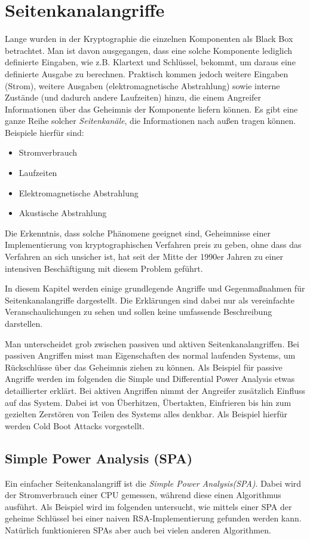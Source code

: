 \chapter{Seitenkanalangriffe}
\label{sec:seitenkanalangriffe}
Lange wurden in der Kryptographie die einzelnen Komponenten als Black
Box betrachtet. Man ist davon ausgegangen, dass eine solche Komponente
lediglich definierte Eingaben, wie z.B. Klartext und Schlüssel, bekommt,
um daraus eine definierte Ausgabe zu berechnen. Praktisch kommen jedoch
weitere Eingaben (Strom), weitere Ausgaben (elektromagnetische
Abstrahlung) sowie interne Zustände (und dadurch andere Laufzeiten)
hinzu, die einem Angreifer Informationen über das Geheimnis der
Komponente liefern können. Es gibt eine ganze Reihe solcher
\emph{Seitenkanäle}, die Informationen nach außen tragen
können. Beispiele hierfür sind:
\begin{itemize}
\item Stromverbrauch
\item Laufzeiten
\item Elektromagnetische Abstrahlung
\item Akustische Abstrahlung
\end{itemize}

Die Erkenntnis, dass solche Phänomene geeignet sind, Geheimnisse einer
Implementierung von kryptographischen Verfahren preis zu geben, ohne
dass das Verfahren an sich unsicher ist, hat seit der Mitte der 1990er
Jahren zu einer intensiven Beschäftigung mit diesem Problem geführt. 

In diesem Kapitel werden einige grundlegende Angriffe und Gegenmaßnahmen
für Seitenkanalangriffe dargestellt. Die Erklärungen sind dabei nur als
vereinfachte Veranschaulichungen zu sehen und sollen keine umfassende
Beschreibung darstellen.

Man unterscheidet grob zwischen passiven und aktiven
Seitenkanalangriffen. Bei passiven Angriffen misst man Eigenschaften des
normal laufenden Systems, um Rückschlüsse über das Geheimnis ziehen zu
können. Als Beispiel für passive Angriffe werden im folgenden die Simple
und Differential Power Analysis etwas detaillierter erklärt. Bei aktiven
Angriffen nimmt der Angreifer zusätzlich Einfluss auf das System. Dabei
ist von Überhitzen, Übertakten, Einfrieren bis hin zum gezielten
Zerstören von Teilen des Systems alles denkbar. Als Beispiel hierfür
werden Cold Boot Attacks vorgestellt. 

\section{Simple Power Analysis (SPA)}
\label{sec:simple-power-analys}
Ein einfacher Seitenkanalangriff ist die \emph{Simple Power
  Analysis(SPA)}. Dabei wird der Stromverbrauch einer CPU gemessen,
während diese einen Algorithmus ausführt. Als Beispiel wird im folgenden
untersucht, wie mittels einer SPA der geheime Schlüssel bei einer naiven
RSA-Implementierung gefunden werden kann. Natürlich funktionieren SPAs
aber auch bei vielen anderen Algorithmen.
